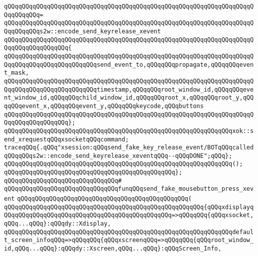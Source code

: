 \verb|qQQqqQQqqQQqqQQqqQQqqQQqqQQqqQQqqQQqqQQqqQQqqQQqqQQqqQQqqQQqqQQqqQQqqQQqqQQqqQQq=|\newline
\verb|qQQqqQQqqQQqqQQqqQQqqQQqqQQqqQQqqQQqqQQqqQQqqQQqqQQqqQQqqQQqqQQqqQQqqQQqqQQqqQQqs2w::encode_send_keyrelease_xevent|\newline
\verb|qQQqqQQqqQQqqQQqqQQqqQQqqQQqqQQqqQQqqQQqqQQqqQQqqQQqqQQqqQQqqQQqqQQqqQQqqQQqqQQqqQQqqQQq{|\newline
\verb|qQQqqQQqqQQqqQQqqQQqqQQqqQQqqQQqqQQqqQQqqQQqqQQqqQQqqQQqqQQqqQQqqQQqqQQqqQQqqQQqqQQqqQQqqQQqqQQqsend_event_to,qQQqqQQqpropagate,qQQqqQQqevent_mask,|\newline
\verb|qQQqqQQqqQQqqQQqqQQqqQQqqQQqqQQqqQQqqQQqqQQqqQQqqQQqqQQqqQQqqQQqqQQqqQQqqQQqqQQqqQQqqQQqqQQqqQQqtimestamp,qQQqqQQqroot_window_id,qQQqqQQqevent_window_id,qQQqqQQqchild_window_id,qQQqqQQqroot_x,qQQqqQQqroot_y,qQQqqQQqevent_x,qQQqqQQqevent_y,qQQqqQQqkeycode,qQQqbuttons|\newline
\verb|qQQqqQQqqQQqqQQqqQQqqQQqqQQqqQQqqQQqqQQqqQQqqQQqqQQqqQQqqQQqqQQqqQQqqQQqqQQqqQQqqQQqqQQq};|\newline
\newline
\verb|qQQqqQQqqQQqqQQqqQQqqQQqqQQqqQQqqQQqqQQqqQQqqQQqqQQqqQQqqQQqqQQqxok::send_xrequestqQQqxsocketqQQqcommand;|\newline
\newline
\verb|traceqQQq{.qQQq"xsession:qQQqsend_fake_key_release_event/BOTqQQqcalledqQQqqQQqs2w::encode_send_keyrelease_xeventqQQq--qQQqDONE";qQQq};|\newline
\verb|qQQqqQQqqQQqqQQqqQQqqQQqqQQqqQQqqQQqqQQqqQQqqQQqqQQqqQQqqQQqqQQq();|\newline
\verb|qQQqqQQqqQQqqQQqqQQqqQQqqQQqqQQqqQQqqQQqqQQqqQQq};|\newline
\verb|qQQqqQQqqQQqqQQqqQQqqQQqqQQqqQQq#|\newline
\verb|qQQqqQQqqQQqqQQqqQQqqQQqqQQqqQQqfunqQQqsend_fake_mousebutton_press_xevent|\newline
\verb|qQQqqQQqqQQqqQQqqQQqqQQqqQQqqQQqqQQqqQQqqQQqqQQq(|\newline
\verb|qQQqqQQqqQQqqQQqqQQqqQQqqQQqqQQqqQQqqQQqqQQqqQQqqQQqqQQq{qQQqxdisplayqQQqqQQqqQQqqQQqqQQqqQQqqQQqqQQqqQQqqQQqqQQqqQQq=>qQQqqQQq{qQQqxsocket,qQQq...qQQq}:qQQqdy::Xdisplay,|\newline
\verb|qQQqqQQqqQQqqQQqqQQqqQQqqQQqqQQqqQQqqQQqqQQqqQQqqQQqqQQqqQQqqQQqdefault_screen_infoqQQq=>qQQqqQQq{qQQqxscreenqQQq=>qQQqqQQq{qQQqroot_window_id,qQQq...qQQq}:qQQqdy::Xscreen,qQQq...qQQq}:qQQqScreen_Info,|\newline
